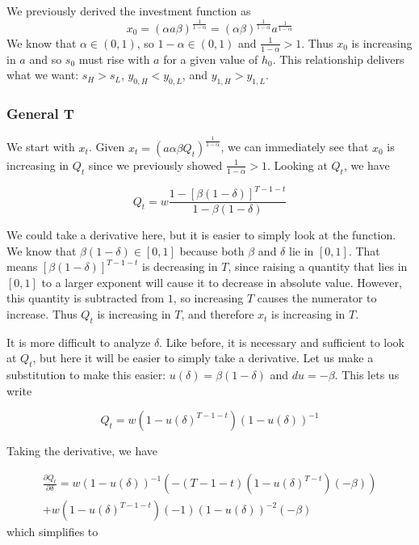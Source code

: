 \documentclass[12pt, letterpaper, parskip = full]{article}
\begin{document}
    We previously derived the investment function as
    \[ x_0 = (\alpha a \beta)^{\frac{1}{1 - \alpha}} = (\alpha \beta)^{\frac{1}{1-\alpha}} a^{\frac{1}{1-\alpha}}    \]
    We know that \(\alpha \in (0,1)\), so \(1-\alpha \in (0,1)\) and \(\frac{1}{1-\alpha} > 1\). Thus \(x_0\) is increasing in \(a\) and so \(s_0\) must rise with \(a\) for a given value of \(h_0\). This relationship delivers what we want: \(s_H > s_L\), \(y_{0,H} < y_{0,L}\), and \(y_{1,H} > y_{1,L}\).

    \subsubsection{General T}

    We start with \(x_t\). Given \( x_t = (a \alpha \beta Q_t)^{\frac{1}{1 - \alpha}}\), we can immediately see that \(x_0\) is increasing in \(Q_t\) since we previously showed \(\frac{1}{1-\alpha} > 1\). Looking at \(Q_t\), we have

    \[  Q_t = w \frac{1 - \left[\beta(1-\delta)\right]^{T-1-t}}{1 - \beta (1 - \delta)}  \]

    We could take a derivative here, but it is easier to simply look at the function. We know that \(\beta (1 - \delta) \in [0,1]\) because both \(\beta\) and \(\delta\) lie in \([0,1]\). That means \(\left[\beta(1-\delta)\right]^{T-1-t}\) is decreasing in \(T\), since raising a quantity that lies in \([0,1]\) to a larger exponent will cause it to decrease in absolute value. However, this quantity is subtracted from \(1\), so increasing \(T\) causes the numerator to increase. Thus \(Q_t\) is increasing in \(T\), and therefore \(x_t\) is increasing in \(T\).
    
    It is more difficult to analyze \(\delta\). Like before, it is necessary and sufficient to look at \(Q_t\), but here it will be easier to simply take a derivative. Let us make a substitution to make this easier: \(u(\delta) = \beta(1-\delta)\) and \(du = -\beta\). This lets us write

    \[ Q_t = w \left(1 - u(\delta)^{T - 1 - t}\right)(1 - u(\delta))^{-1} \]
    
    Taking the derivative, we have
    
    \begin{align*}
    \frac{\partial Q_t}{\partial \delta} = w (1 - u(\delta))^{-1} (-(T - 1 - t) (1 - u(\delta)^{T - t}) (- \beta)) \\ + w \left(1 - u(\delta)^{T - 1 - t}\right) (-1) (1 - u(\delta))^{-2} (-\beta)
    \end{align*}
    which simplifies to 
\end{document}
